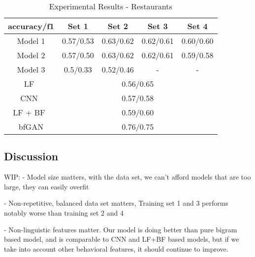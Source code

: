 \documentclass[conference, 11pt]{IEEEtran} %
\theoremstyle{plain}
\theoremstyle{definition}
\begin{document}
\begin{table}[H]
\small
\caption{Experimental Results - Restaurants}
\centering
\begin{tabular}{|c|c|c|c|c|}
\hline
 accuracy/f1 & Set 1 & Set 2 & Set 3 & Set 4 \\ \hline
Model 1 & 0.57/0.53 & 0.63/0.62 & 0.62/0.61 & 0.60/0.60 \\ \hline
Model 2 & 0.57/0.50 & 0.63/0.62 & 0.62/0.61 & 0.59/0.58 \\ \hline
Model 3 & 0.5/0.33 & 0.52/0.46 & - & - \\ \hline
LF~\cite{Tang2020} & \multicolumn{4}{c|}{0.56/0.65} \\ \hline
CNN~\cite{Tang2020} & \multicolumn{4}{c|}{0.57/0.58} \\ \hline
LF + BF~\cite{Tang2020} & \multicolumn{4}{c|}{0.59/0.60} \\ \hline
bfGAN\cite{Tang2020}& \multicolumn{4}{c|}{0.76/0.75} \\
\hline
\end{tabular}
\label{exp-restaurants}

\end{table}




\subsection{Discussion}
WIP:
- Model size matters, with the data set, we can't afford models that are too large, they can easily overfit

- Non-repetitive, balanced data set matters, Training set 1 and 3 performs notably worse than training set 2 and 4

- Non-linguistic features matter. Our model is doing better than pure bigram based model, and is comparable to CNN and LF+BF based models, but if we take into account other behavioral features, it should continue to improve.
\end{document}
